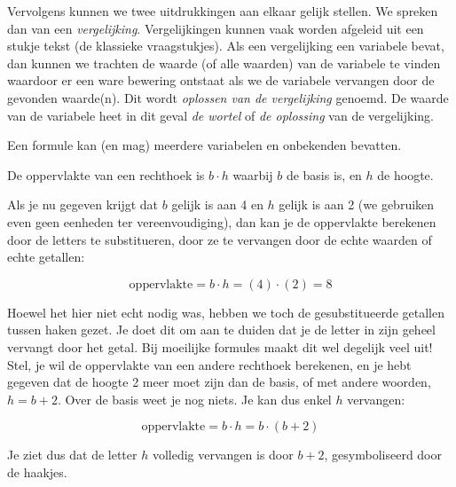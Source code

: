 Vervolgens kunnen we twee uitdrukkingen aan elkaar gelijk
stellen. We spreken dan van een \emph{vergelijking}. Vergelijkingen
kunnen vaak worden afgeleid uit een stukje tekst (de klassieke vraagstukjes).
Als een vergelijking een variabele bevat, dan kunnen we trachten de
waarde (of alle waarden) van de variabele te vinden waardoor er een
ware bewering ontstaat als we de variabele vervangen door de gevonden
waarde(n). Dit wordt \emph{oplossen van de vergelijking} genoemd.
De waarde van de variabele heet in dit geval \emph{de wortel} of \emph{de
oplossing} van de vergelijking.

Een formule kan (en mag) meerdere variabelen en onbekenden
bevatten. 


\begin{voorbeeld}
	De oppervlakte van een rechthoek is $b \cdot h$ waarbij $b$ de basis is,
en $h$ de hoogte.

Als je nu gegeven krijgt dat $b$ gelijk is aan 4 en $h$ gelijk is
aan 2 (we gebruiken even geen eenheden ter vereenvoudiging), dan kan
je de oppervlakte berekenen door de letters te substitueren, door
ze te vervangen door de echte waarden of echte getallen:

\begin{equation*}
\mathrm{oppervlakte}=b\cdot h=(4)\cdot(2)=8
\end{equation*}

Hoewel het hier niet echt nodig was, hebben we toch de gesubstitueerde
getallen tussen haken gezet. Je doet dit om aan te duiden dat je de
letter in zijn geheel vervangt door het getal. Bij moeilijke formules
maakt dit wel degelijk veel uit! Stel, je wil de oppervlakte van een
andere rechthoek berekenen, en je hebt gegeven dat de hoogte 2 meer
moet zijn dan de basis, of met andere woorden, $h=b+2$. Over de basis
weet je nog niets. Je kan dus enkel $h$ vervangen:

\begin{equation*}
\mathrm{oppervlakte}=b\cdot h=b\cdot(b+2)
\end{equation*}

Je ziet dus dat de letter $h$ volledig vervangen is door $b+2$,
gesymboliseerd door de haakjes.
\end{voorbeeld}



